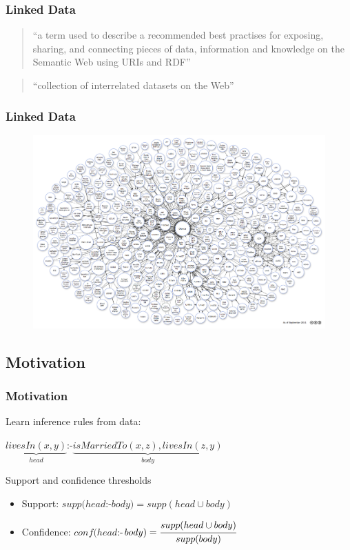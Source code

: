 \documentclass{beamer}
\begin{document}
\begin{frame}
\frametitle{Linked Data}
\begin{quote}
 ``a term used to describe a recommended best practises for exposing, sharing, and connecting pieces of data,
information and knowledge on the Semantic Web using URIs and RDF''
\end{quote}
\begin{quote}
 ``collection of interrelated datasets on the Web''
\end{quote}
\end{frame}


\begin{frame}
\frametitle{Linked Data}
 \begin{figure}
 \includegraphics[width=0.8\linewidth]{./Figures/lod-datasets_2011-09-19}
 \end{figure}
\end{frame}

\subsection{Motivation}

\begin{frame}
\frametitle{Motivation}
Learn inference rules from data:
\begin{center}
  $\underbrace{livesIn(x,y)}_{head}$:-$\underbrace{isMarriedTo(x,z),livesIn(z,y)}_{body}$
\end{center}
Support and confidence thresholds
\begin{itemize}
 \item Support: $supp(head$:-$body)=supp(head \cup body)$
 \item Confidence: $conf(head$:-$body)=\cfrac{supp(head \cup body)}{supp(body)}$ 
\end{itemize}
\end{frame}
\end{document}

